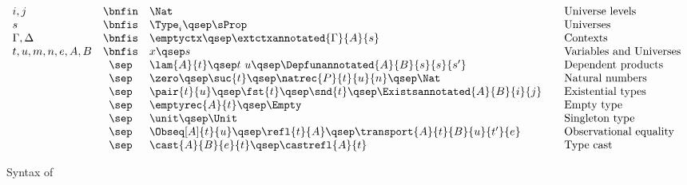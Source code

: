 \begin{figure}
	\begin{small}
		\[
		\begin{array}{lclcl}
		i,j								& \bnfin	& \Nat																					&  & \text{Universe levels}\\
		s									& \bnfis	& \Type_i \qsep \sProp														&  & \text{Universes}\\
		\Gamma , \Delta   & \bnfis	& \emptyctx 
																\qsep \extctxannotated{\Gamma}{A}{s}						&  & \text{Contexts}\\
		t,u,m,n,e,A,B     & \bnfis	& x \qsep s 																		&  & \text{Variables and Universes}\\
											& \sep		& \lam{A}{t} \qsep t\ u 
																\qsep \Depfunannotated{A}{B}{s}{s}{s'} 					&  & \text{Dependent products}\\
											& \sep		& \zero \qsep \suc{t} \qsep \natrec{P}{t}{u}{n} 
																\qsep \Nat																			&  & \text{Natural numbers}\\
											& \sep		& \pair{t}{u} \qsep \fst{t} \qsep \snd{t} 
																\qsep \Existsannotated{A}{B}{i}{j} 							&  & \text{Existential types}\\
											& \sep		& \emptyrec{A}{t} \qsep \Empty									&  & \text{Empty type}\\
											& \sep		& \unit \qsep \Unit															&  & \text{Singleton type}\\
											& \sep		& \Obseq[A]{t}{u} \qsep \refl{t}{A} 
																\qsep \transport{A}{t}{B}{u}{t'}{e}							&  & \text{Observational equality}\\
											& \sep		& \cast{A}{B}{e}{t} \qsep \castrefl{A}{t}				&  & \text{Type cast}
		\end{array}
		\]
	\end{small}
	\caption{Syntax of \SetoidCC}
	\label{fig:syntax}
\end{figure}

